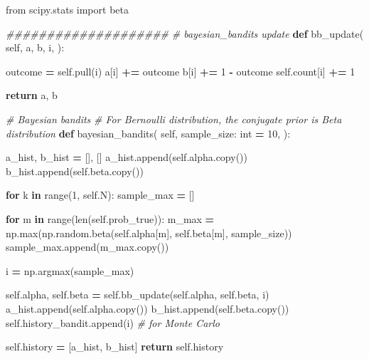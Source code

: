 \documentclass[
]{book}
\newenvironment{Shaded}{\begin{snugshade}}{\end{snugshade}}
\newcommand{\BuiltInTok}[1]{#1}
\newcommand{\CommentTok}[1]{\textcolor[rgb]{0.56,0.35,0.01}{\textit{#1}}}
\newcommand{\ControlFlowTok}[1]{\textcolor[rgb]{0.13,0.29,0.53}{\textbf{#1}}}
\newcommand{\DecValTok}[1]{\textcolor[rgb]{0.00,0.00,0.81}{#1}}
\newcommand{\ImportTok}[1]{#1}
\newcommand{\KeywordTok}[1]{\textcolor[rgb]{0.13,0.29,0.53}{\textbf{#1}}}
\newcommand{\NormalTok}[1]{#1}
\newcommand{\OperatorTok}[1]{\textcolor[rgb]{0.81,0.36,0.00}{\textbf{#1}}}
\newcommand{\VariableTok}[1]{\textcolor[rgb]{0.00,0.00,0.00}{#1}}
\theoremstyle{definition}
\theoremstyle{definition}
\theoremstyle{definition}
\theoremstyle{definition}
\theoremstyle{remark}
\begin{document}
\begin{Shaded}
\begin{Highlighting}[]
\ImportTok{from}\NormalTok{ scipy.stats }\ImportTok{import}\NormalTok{ beta}

    \CommentTok{\#\#\#\#\#\#\#\#\#\#\#\#\#\#\#\#\#\#\#\#}
    \CommentTok{\# bayesian\_bandits update}
    \KeywordTok{def}\NormalTok{ bb\_update(}
            \VariableTok{self}\NormalTok{,}
\NormalTok{            a,}
\NormalTok{            b,}
\NormalTok{            i,}
\NormalTok{    ):}

\NormalTok{        outcome }\OperatorTok{=} \VariableTok{self}\NormalTok{.pull(i)}
\NormalTok{        a[i] }\OperatorTok{+=}\NormalTok{ outcome}
\NormalTok{        b[i] }\OperatorTok{+=} \DecValTok{1} \OperatorTok{{-}}\NormalTok{ outcome}
        \VariableTok{self}\NormalTok{.count[i] }\OperatorTok{+=} \DecValTok{1}

        \ControlFlowTok{return}\NormalTok{ a, b}

    \CommentTok{\# Bayesian bandits}
    \CommentTok{\# For Bernoulli distribution, the conjugate prior is Beta distribution}
    \KeywordTok{def}\NormalTok{ bayesian\_bandits(}
            \VariableTok{self}\NormalTok{,}
\NormalTok{            sample\_size: }\BuiltInTok{int} \OperatorTok{=} \DecValTok{10}\NormalTok{,}
\NormalTok{    ):}

\NormalTok{        a\_hist, b\_hist }\OperatorTok{=}\NormalTok{ [], []}
\NormalTok{        a\_hist.append(}\VariableTok{self}\NormalTok{.alpha.copy())}
\NormalTok{        b\_hist.append(}\VariableTok{self}\NormalTok{.beta.copy())}

        \ControlFlowTok{for}\NormalTok{ k }\KeywordTok{in} \BuiltInTok{range}\NormalTok{(}\DecValTok{1}\NormalTok{, }\VariableTok{self}\NormalTok{.N):}
\NormalTok{            sample\_max }\OperatorTok{=}\NormalTok{ []}

            \ControlFlowTok{for}\NormalTok{ m }\KeywordTok{in} \BuiltInTok{range}\NormalTok{(}\BuiltInTok{len}\NormalTok{(}\VariableTok{self}\NormalTok{.prob\_true)):}
\NormalTok{                m\_max }\OperatorTok{=}\NormalTok{ np.}\BuiltInTok{max}\NormalTok{(np.random.beta(}\VariableTok{self}\NormalTok{.alpha[m], }\VariableTok{self}\NormalTok{.beta[m], sample\_size))}
\NormalTok{                sample\_max.append(m\_max.copy())}

\NormalTok{            i }\OperatorTok{=}\NormalTok{ np.argmax(sample\_max)}

            \VariableTok{self}\NormalTok{.alpha, }\VariableTok{self}\NormalTok{.beta }\OperatorTok{=} \VariableTok{self}\NormalTok{.bb\_update(}\VariableTok{self}\NormalTok{.alpha, }\VariableTok{self}\NormalTok{.beta, i)}
\NormalTok{            a\_hist.append(}\VariableTok{self}\NormalTok{.alpha.copy())}
\NormalTok{            b\_hist.append(}\VariableTok{self}\NormalTok{.beta.copy())}
            \VariableTok{self}\NormalTok{.history\_bandit.append(i)  }\CommentTok{\# for Monte Carlo}

        \VariableTok{self}\NormalTok{.history }\OperatorTok{=}\NormalTok{ [a\_hist, b\_hist]}
        \ControlFlowTok{return} \VariableTok{self}\NormalTok{.history}
\end{Highlighting}
\end{Shaded}
\end{document}
